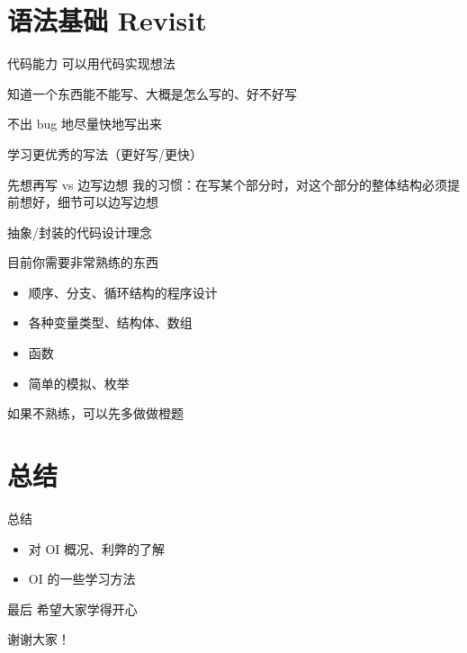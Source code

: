 \documentclass[11pt,aspectratio=169]{beamer}
\begin{document}
\section{语法基础 Revisit}

\begin{frame}{代码能力}
    可以用代码实现想法

    知道一个东西能不能写、大概是怎么写的、好不好写
    
    不出 bug 地尽量快地写出来

    学习更优秀的写法（更好写/更快）
\end{frame}

\begin{frame}{先想再写 vs 边写边想}
    我的习惯：在写某个部分时，对这个部分的整体结构必须提前想好，细节可以边写边想

    抽象/封装的代码设计理念
\end{frame}

\begin{frame}{目前你需要非常熟练的东西}
    \begin{itemize}
        \item 顺序、分支、循环结构的程序设计
        \item 各种变量类型、结构体、数组
        \item 函数
        \item 简单的模拟、枚举
    \end{itemize}

    如果不熟练，可以先多做做橙题
\end{frame}

\section{总结}

\begin{frame}{总结}
\begin{itemize}
    \item 对 OI 概况、利弊的了解
    \item OI 的一些学习方法
\end{itemize}
\end{frame}

\begin{frame}{最后}
希望大家学得开心

\pause
\centerline{\Large 谢谢大家！}
\end{frame}
\end{document}

